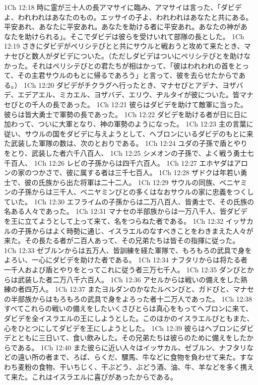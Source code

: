 1Ch 12:18  時に霊が三十人の長アマサイに臨み、アマサイは言った、「ダビデよ、われわれはあなたのもの。エッサイの子よ、われわれはあなたと共にある。平安あれ、あなたに平安あれ。あなたを助ける者に平安あれ。あなたの神があなたを助けられる」。そこでダビデは彼らを受けいれて部隊の長とした。
1Ch 12:19  さきにダビデがペリシテびとと共にサウルと戦おうと攻めて来たとき、マナセびと数人がダビデについた。（ただしダビデはついにペリシテびとを助けなかった。それはペリシテびとの君たちが相はかって、「彼はわれわれの首をとって、その主君サウルのもとに帰るであろう」と言って、彼を去らせたからである。）
1Ch 12:20  ダビデがチクラグへ行ったとき、マナセびとアデナ、ヨザバデ、エデアエル、ミカエル、ヨザバデ、エリウ、ヂルタイが彼についた。皆マナセびとの千人の長であった。
1Ch 12:21  彼らはダビデを助けて敵軍に当った。彼らは皆大勇士で軍勢の長であった。
1Ch 12:22  ダビデを助ける者が日に日に加わって、ついに大軍となり、神の軍勢のようになった。
1Ch 12:23  主の言葉に従い、サウルの国をダビデに与えようとして、ヘブロンにいるダビデのもとに来た武装した軍隊の数は、次のとおりである。
1Ch 12:24  ユダの子孫で盾とやりをとり、武装した者六千八百人、
1Ch 12:25  シメオンの子孫で、よく戦う勇士七千百人、
1Ch 12:26  レビの子孫からは四千六百人。
1Ch 12:27  エホヤダはアロンの家のつかさで、彼に属する者は三千七百人。
1Ch 12:28  ザドクは年若い勇士で、彼の氏族から出た将軍は二十二人。
1Ch 12:29  サウルの同族、ベニヤミンの子孫からは三千人、ベニヤミンびとの多くはなおサウルの家に忠義をつくしていた。
1Ch 12:30  エフライムの子孫からは二万八百人、皆勇士で、その氏族の名ある人々であった。
1Ch 12:31  マナセの半部族からは一万八千人、皆ダビデを王に立てようとして上って来て、名をつらねた者である。
1Ch 12:32  イッサカルの子孫からはよく時勢に通じ、イスラエルのなすべきことをわきまえた人々が来た。その長たる者が二百人あって、その兄弟たちは皆その指揮に従った。
1Ch 12:33  ゼブルンからは五万人、皆訓練を経た軍隊で、もろもろの武具で身をよろい、一心にダビデを助けた者である。
1Ch 12:34  ナフタリからは将たる者一千人および盾とやりをとってこれに従う者三万七千人。
1Ch 12:35  ダンびとからは武装した者二万八千六百人。
1Ch 12:36  アセルからは戦いの備えをした熟練の者四万人。
1Ch 12:37  またヨルダンのかなたルベンびと、ガドびと、マナセの半部族からはもろもろの武具で身をよろった者十二万人であった。
1Ch 12:38  すべてこれらの戦いの備えをしたいくさびとらは真心をもってヘブロンに来て、ダビデを全イスラエルの王にしようとした。このほかのイスラエルびともまた、心をひとつにしてダビデを王にしようとした。
1Ch 12:39  彼らはヘブロンにダビデとともに三日いて、食い飲みした。その兄弟たちは彼らのために備えをしたからである。
1Ch 12:40  また彼らに近い人々はイッサカル、ゼブルン、ナフタリなどの遠い所の者まで、ろば、らくだ、騾馬、牛などに食物を負わせて来た。すなわち麦粉の食物、干いちじく、干ぶどう、ぶどう酒、油、牛、羊などを多く携えて来た。これはイスラエルに喜びがあったからである。
